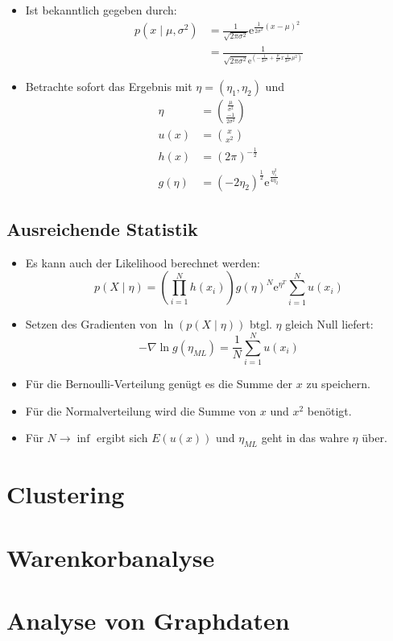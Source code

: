 \documentclass{scrartcl}
\begin{document}
\begin{itemize}
	\item Ist bekanntlich gegeben durch:
	\begin{align*}
		p(x \mid \mu, \sigma^2) &= \frac{1}{\sqrt{2 \pi \sigma^2}} 
		\mathrm{e}^{\frac{1}{2 \sigma^2} (x-\mu)^2} \\
		&=\frac{1}{\sqrt{2 \pi \sigma^2} \mathrm{e}^{(-\frac{1}{2 \sigma^2} + 
		\frac{\mu}{\sigma^2}x \frac{1}{2 \sigma^2} \mu^2)}}
	\end{align*}
	\item Betrachte sofort das Ergebnis mit $ \eta = (\eta_1, \eta_2) $ und
	\begin{align*}
		\eta &= \binom{\frac{\mu}{\sigma^2}}{\frac{-1}{2 \sigma^2}} \\
		u(x) &= \binom{x}{x^2} \\
		h(x) &= (2\pi)^{- \frac{1}{2}} \\
		g(\eta) &= (-2 \eta_2)^{\frac{1}{2}} \mathrm{e}^{\frac{\eta_1^2}{4 
		\eta_2}}
	\end{align*}
\end{itemize}

\subsection{Ausreichende Statistik}

\begin{itemize}
	\item Es kann auch der Likelihood berechnet werden:
	\[ p(X \mid \eta) = (\prod_{i=1}^{N} h(x_i)) g(\eta)^N \mathrm{e}^{\eta^T} 
	\sum_{i=1}^{N} u(x_i) \]
	\item Setzen des Gradienten von $ \ln (p(X \mid \eta)) $ btgl. $ \eta $ 
	gleich Null liefert:
	\[ - \nabla \ln g(\eta_{ML}) = \frac{1}{N} \sum_{i=1}^{N} u(x_i) \]
	\item Für die Bernoulli-Verteilung genügt es die Summe der $ x $ zu 
	speichern.
	\item Für die Normalverteilung wird die Summe von $ x $ und $ x^2 $ 
	benötigt.
	\item Für $ N \rightarrow \inf $ ergibt sich $ E(u(x)) $ und $ \eta_{ML} $ 
	geht in das wahre $ \eta $ über.
\end{itemize}

\section{Clustering}

\section{Warenkorbanalyse}

\section{Analyse von Graphdaten}
\end{document}
